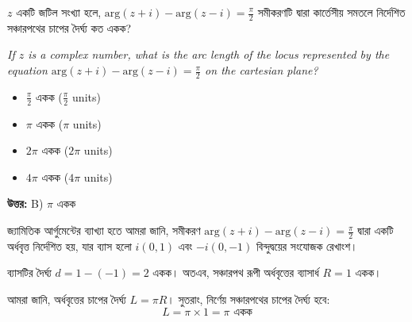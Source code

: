 \documentclass[12pt, a4paper]{article}
\begin{document}
\begin{tcolorbox}[questionbox={প্রশ্ন (Question) 5}]
    \noindent
    $z$ একটি জটিল সংখ্যা হলে, $\text{arg}(z+i) - \text{arg}(z-i) = \frac{\pi}{2}$ সমীকরণটি দ্বারা কার্তেসীয় সমতলে নির্দেশিত সঞ্চারপথের চাপের দৈর্ঘ্য কত একক?
    
    \vspace{0.8em}
    \begin{english}
    \noindent\textit{\color{darkgray}
    If $z$ is a complex number, what is the arc length of the locus represented by the equation $\text{arg}(z+i) - \text{arg}(z-i) = \frac{\pi}{2}$ on the cartesian plane?
    }
    \end{english}
\end{tcolorbox}

\begin{itemize}[label={}, leftmargin=1cm, itemsep=0.5em]
    \item[\textbf{A)}] $\frac{\pi}{2}$ একক ($\frac{\pi}{2}$ units)
    \item[\textbf{B)}] $\pi$ একক ($\pi$ units)
    \item[\textbf{C)}] $2\pi$ একক ($2\pi$ units)
    \item[\textbf{D)}] $4\pi$ একক ($4\pi$ units)
\end{itemize}

\vspace{0.5em}
\begin{tcolorbox}[answerbox]
    \textbf{\color{success} উত্তর:} B) $\pi$ একক
\end{tcolorbox}
\vspace{1em}

\begin{tcolorbox}[solutionbox={সমাধান (Solution)}]
    \noindent
    জ্যামিতিক আর্গুমেন্টের ব্যাখ্যা হতে আমরা জানি, সমীকরণ $\text{arg}(z+i) - \text{arg}(z-i) = \frac{\pi}{2}$ দ্বারা একটি অর্ধবৃত্ত নির্দেশিত হয়, যার ব্যাস হলো $i(0, 1)$ এবং $-i(0, -1)$ বিন্দুদ্বয়ের সংযোজক রেখাংশ। 
    
    \vspace{0.5em}
    ব্যাসটির দৈর্ঘ্য $d = 1 - (-1) = 2$ একক। 
    অতএব, সঞ্চারপথ রূপী অর্ধবৃত্তের ব্যাসার্ধ $R = 1$ একক। 
    
    \vspace{0.5em}
    আমরা জানি, অর্ধবৃত্তের চাপের দৈর্ঘ্য $L = \pi R$। 
    সুতরাং, নির্ণেয় সঞ্চারপথের চাপের দৈর্ঘ্য হবে:
    \[ L = \pi \times 1 = \pi \text{ একক} \]
\end{tcolorbox}
\end{document}
